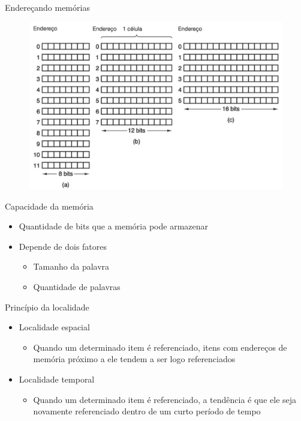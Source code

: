 \documentclass[aspectratio=169,
				xcolor=table]{beamer}
\begin{document}
	\begin{frame}{Endereçando memórias}
		\begin{figure}[hbtp]
			\centering
			\includegraphics[height=0.8\textheight, keepaspectratio]{../figs/cap07/endercamento.png}
		\end{figure}
			
	\end{frame}
	
	\begin{frame}{Capacidade da memória}
		\begin{itemize}
			\item Quantidade de bits que a memória pode armazenar
			\vspace{1em}
			\item Depende de dois fatores
			\begin{itemize} 
				\item Tamanho da palavra
				\item Quantidade de palavras 
			\end{itemize}
		\end{itemize}
	\end{frame}

	\begin{frame}{Princípio da localidade}
		\begin{itemize}
			\item Localidade espacial
			\begin{itemize}
				\item Quando um determinado item é referenciado, itens com endereços de memória próximo a ele tendem a ser logo referenciados
			\end{itemize}
			\vspace{1em}
			\item Localidade temporal
			\begin{itemize}
				\item Quando um determinado item é referenciado, a tendência é que ele seja novamente referenciado dentro de um curto período de tempo
			\end{itemize}
		\end{itemize}
		
	\end{frame}		
	
\end{document}
